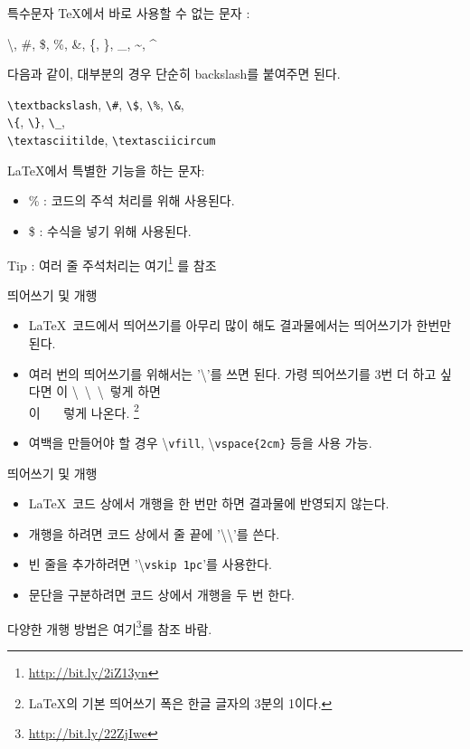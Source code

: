 \documentclass[12pt]{gshs_lecture}
\begin{document}
\begin{frame}[t]{특수문자}
	\TeX 에서 바로 사용할 수 없는 문자 : 
	\begin{center}
		\textbackslash, \#, \$, \%, \&, \{, \}, \_, \textasciitilde, 
		\textasciicircum
	\end{center}
	다음과 같이, 대부분의 경우 단순히 backslash를 붙여주면 된다.
	\begin{center}
		\texttt{\textbackslash textbackslash}, \texttt{\textbackslash \#}, \texttt{\textbackslash \$}, \texttt{\textbackslash \%}, \texttt{\textbackslash \&},\\
		\texttt{\textbackslash \{}, \texttt{\textbackslash \}}, \texttt{\textbackslash \_},\\
		\texttt{\textbackslash textasciitilde}, \texttt{\textbackslash textasciicircum}
	\end{center}
	
	\LaTeX 에서 특별한 기능을 하는 문자:
	\begin{itemize}
		\item \% : 코드의 주석 처리를 위해 사용된다.
		\item \$ : 수식을 넣기 위해 사용된다.
	\end{itemize}
	Tip : 여러 줄 주석처리는 여기\footnote[frame]{\url{http://bit.ly/2iZ13yn}} 를 참조
\end{frame}

\begin{frame}[t]{띄어쓰기 및 개행}
	\begin{itemize}
		\item \LaTeX\ 코드에서 띄어쓰기를 아무리 많이 해도 결과물에서는 
		띄어쓰기가 한번만 된다.
		\item 여러 번의 띄어쓰기를 위해서는 '\textbackslash'를 쓰면 된다.
		가령 띄어쓰기를 3번 더 하고 싶다면 이 \textbackslash \ \textbackslash \ \textbackslash  \ 렇게 하면\\
		이 \ \ \ 렇게 나온다. \footnote[frame]{\LaTeX 의 기본 띄어쓰기 폭은 한글 글자의 3분의 1이다.}
		\item 여백을 만들어야 할 경우 \textbackslash \texttt{vfill}, \textbackslash \texttt{vspace\{2cm\}} 등을 사용 가능.
	\end{itemize}
\end{frame}

\begin{frame}[t]{띄어쓰기 및 개행}
	\begin{itemize}	
		\item \LaTeX\ 코드 상에서 개행을 한 번만 하면 결과물에 반영되지 않는다.
		\item 개행을 하려면 코드 상에서 줄 끝에 '\textbackslash \textbackslash'를 쓴다.
		\item 빈 줄을 추가하려면 '\textbackslash \texttt{vskip 1pc}'를 사용한다.
		\item 문단을 구분하려면 코드 상에서 개행을 두 번 한다.		
	\end{itemize}
	다양한 개행 방법은 여기\footnote[frame]{\url{http://bit.ly/22ZjIwe}}를 참조 바람.
\end{frame}
\end{document}
